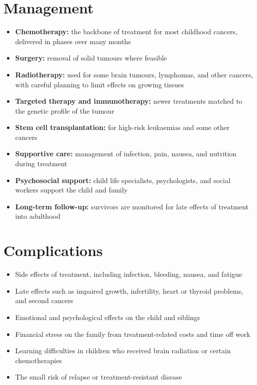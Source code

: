 \section*{Management}
\begin{itemize}
    \item \textbf{Chemotherapy:} the backbone of treatment for most childhood cancers, delivered in phases over many months
    \item \textbf{Surgery:} removal of solid tumours where feasible
    \item \textbf{Radiotherapy:} used for some brain tumours, lymphomas, and other cancers, with careful planning to limit effects on growing tissues
    \item \textbf{Targeted therapy and immunotherapy:} newer treatments matched to the genetic profile of the tumour
    \item \textbf{Stem cell transplantation:} for high-risk leukaemias and some other cancers
    \item \textbf{Supportive care:} management of infection, pain, nausea, and nutrition during treatment
    \item \textbf{Psychosocial support:} child life specialists, psychologists, and social workers support the child and family
    \item \textbf{Long-term follow-up:} survivors are monitored for late effects of treatment into adulthood
\end{itemize}

\section*{Complications}
\begin{itemize}
    \item Side effects of treatment, including infection, bleeding, nausea, and fatigue
    \item Late effects such as impaired growth, infertility, heart or thyroid problems, and second cancers
    \item Emotional and psychological effects on the child and siblings
    \item Financial stress on the family from treatment-related costs and time off work
    \item Learning difficulties in children who received brain radiation or certain chemotherapies
    \item The small risk of relapse or treatment-resistant disease
\end{itemize}


